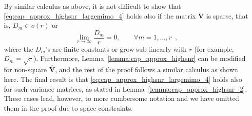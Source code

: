 \documentclass[10pt,conference]{IEEEtran}
\newcommand{\modV}{\hat{\mathbf{V}}}
\newcommand{\rankH}{r}
\begin{document}
By similar calculus as above, it is not difficult to show that
\eqref{eq:cap_approx_highsnr_largemimo_4} holds also if
the matrix $\mathbf{V}$ is sparse, that is,
$D_{m} \in o(\rankH)$ or
\begin{equation}
	\label{eq:cond_Dm_2}
	\lim_{\rankH\to\infty} \frac{D_{m}}{\rankH} = 0, \qquad \forall m = 1,\ldots,\rankH \enspace,
\end{equation}
where the $D_{m}$'s are finite constants or grow sub-linearly with $r$ (for example, $D_{m} = \sqrt{\rankH}$).
Furthermore, Lemma~\ref{lemma:cap_approx_highsnr} can be modified for non-square $\modV$, and the rest of the proof follows a similar calculus as shown here.  The final result is that \eqref{eq:cap_approx_highsnr_largemimo_4} holds also for such variance matrices, as stated in Lemma~\ref{lemma:cap_approx_highsnr_2}. These cases lead, however, to more cumbersome notation and we have omitted them in the proof due to space constraints.







\end{document}
